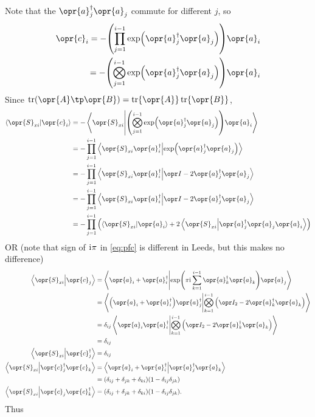 \documentclass[../thesis.tex]{subfiles}
\begin{document}
Note that the $\opr{a}_j^\dag\opr{a}_j$ commute for different $j$, so
\begin{align}
  \opr{c}_i
  = -\qty(\prod_{j=1}^{i-1}\exp(\opr{a}_j^\dag\opr{a}_j))\opr{a}_i \\
  = -\qty(\bigotimes_{j=1}^{i-1}\exp(\opr{a}_j^\dag\opr{a}_j))\opr{a}_i \\
\end{align}
Since $\tr(\opr{A} \tp \opr{B}) = \tr\opr{A}\tr\opr{B}$,
\begin{align}
  \ip{\opr{S}_{xi}}{\opr{c}_i}
  &= -\ip{\opr{S}_{xi}}{\qty(\bigotimes_{j=1}^{i-1}\exp(\opr{a}_j^\dag\opr{a}_j))\opr{a}_i} \\
  &= -\prod_{j=1}^{i-1}\ip{\opr{S}_{xi}\opr{a}_i^\dag}{\exp(\opr{a}_j^\dag\opr{a}_j)} \\
  &= -\prod_{j=1}^{i-1}\ip{\opr{S}_{xi}\opr{a}_i^\dag}{\idopr - 2\opr{a}_j^\dag\opr{a}_j} \\
  &= -\prod_{j=1}^{i-1}\ip{\opr{S}_{xi}\opr{a}_i^\dag}{\idopr - 2\opr{a}_j^\dag\opr{a}_j} \\
  &= -\prod_{j=1}^{i-1}\qty(%
  \ip{\opr{S}_{xi}}{\opr{a}_i}
  + 2\ip{\opr{S}_{xi}}{\opr{a}_j^\dag\opr{a}_j\opr{a}_i} 
  ) \\
\end{align}
OR (note that sign of $\mathrm{i}\mkern1mu\pi$ in \cref{eq:pfc} is different in Leeds, but this
makes no difference)
\begin{align}
  \ip{\opr{S}_{xi}}{\opr{c}_j}
  &= \ip{\opr{a}_i + \opr{a}_i^\dag}{\exp(\pi\im\sum_{k=1}^{i-1}
  \opr{a}_k^\dag\opr{a}_k)\opr{a}_j} \\
  &= \ip{\qty(\opr{a}_i + \opr{a}_i^\dag)\opr{a}_j^\dag}{\bigotimes_{k=1}^{i-1}
  \qty(\idopr_2 - 2\opr{a}_k^\dag\opr{a}_k)} \\
  &= \delta_{ij}\ip{\opr{a}_i\opr{a}_i^\dag}{\bigotimes_{k=1}^{i-1}
  \qty(\idopr_2 - 2\opr{a}_k^\dag\opr{a}_k)}
  \\
  &= \delta_{ij}
  \\
  \ip{\opr{S}_{xi}}{\opr{c}_j^\dag}
  &= \delta_{ij}
  \\
  \ip{\opr{S}_{xi}}{\opr{c}_j^\dag\opr{c}_k}
  &= \ip{\opr{a}_i + \opr{a}_i^\dag}{\opr{a}_j^\dag\opr{a}_k} \\
  &= (\delta_{ij} + \delta_{jk} + \delta_{ki})(1 - \delta_{ij}\delta_{jk})
  \\
  \ip{\opr{S}_{xi}}{\opr{c}_j\opr{c}_k^\dag}
  &= (\delta_{ij} + \delta_{jk} + \delta_{ki})(1 - \delta_{ij}\delta_{jk}).
\end{align}
Thus
\end{document}
